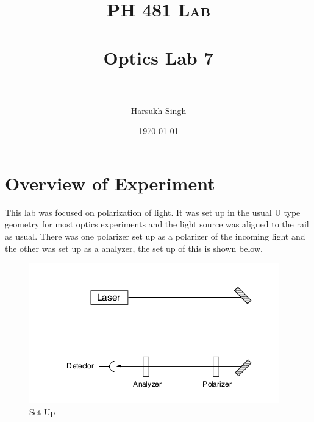 \documentclass[paper=a4, fontsize=11pt]{scrartcl} %
\title{	
\normalfont \normalsize 
\textsc{PH 481 Lab} \\ [25pt] 
\horrule{2pt} \\[0.5cm] %
\huge Optics Lab 7\\ %
\horrule{2pt} \\[0.5cm] %
}
\author{Harsukh Singh} %
\date{\normalsize \today} %
\numberwithin{equation}{section}
\numberwithin{figure}{section}
\numberwithin{table}{section}
\begin{document}
\maketitle %
\section{Overview of Experiment}
This lab was focused on polarization of light. It was set up in the usual U type geometry for most optics experiments and the light source was aligned to the rail as usual. There was one polarizer set up as a polarizer of the incoming light and the other was set up as a analyzer, the set up of this is shown below.
\begin{figure}[H]
\centering
\includegraphics[scale =0.4]{stage}
\caption{Set Up}
\end{figure}
\end{document}
